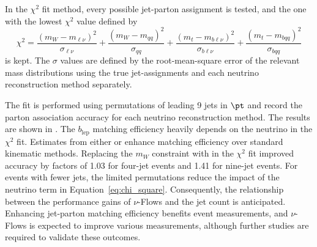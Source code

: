 In the $\chi^2$ fit method, every possible jet-parton assignment is tested, and the one with the lowest $\chi^2$ value defined by
\begin{equation}
    \chi^2=\frac{(m_W-m_{\ell\nu})^2}{\sigma_{\ell\nu}} +\frac{(m_W-m_{qq})^2}{\sigma_{qq}} +\frac{(m_t-m_{b\ell\nu})^2}{\sigma_{b\ell\nu}} +\frac{(m_t-m_{bqq})^2}{\sigma_{bqq}}
    \label{eq:chi_square}
\end{equation}
is kept.
The $\sigma$ values are defined by the root-mean-square error of the relevant mass distributions using the true jet-assignments and each neutrino reconstruction method separately.

The fit is performed using permutations of leading 9 jets in $\pt$ and record the parton association accuracy for each neutrino reconstruction method.
The results are shown in .
The $b_\text{lep}$ matching efficiency heavily depends on the neutrino in the $\chi^2$ fit.
Estimates from either \vsample or \vmode enhance matching efficiency over standard kinematic methods.
Replacing the $m_W$ constraint with \vmode in the $\chi^2$ fit improved accuracy by factors of 1.03 for four-jet events and 1.41 for nine-jet events.
For events with fewer jets, the limited permutations reduce the impact of the neutrino term in Equation~\ref{eq:chi_square}.
Consequently, the relationship between the performance gains of $\nu$-Flows and the jet count is anticipated.
Enhancing jet-parton matching efficiency benefits \ttbar event measurements, and $\nu$-Flows is expected to improve various measurements, although further studies are required to validate these outcomes.

